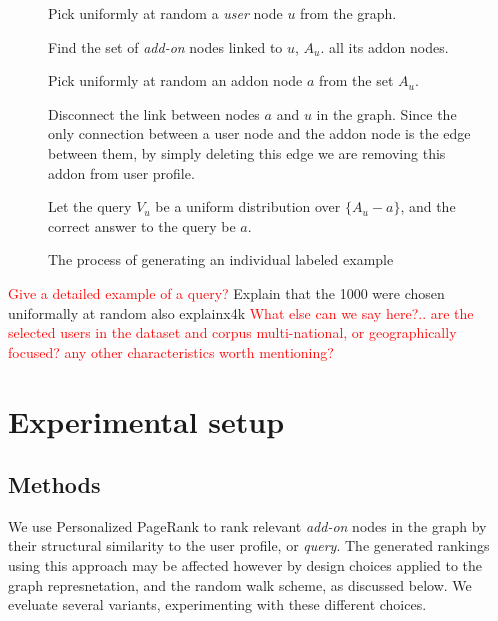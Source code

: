 \documentclass[11pt,oneside]{book}
\let\Oldsection\section
\renewcommand{\section}{\FloatBarrier\Oldsection}
\let\Oldsubsection\subsection
\renewcommand{\subsection}{\FloatBarrier\Oldsubsection}
\begin{document}
\begin{figure}
\begin{enumerate}[(a)]
\begin{small}
\item Pick uniformly at random a {\it user} node $u$ from the graph.
\item Find the set of {\it add-on} nodes linked to $u$, $A_u$.
  all its addon nodes.
\item Pick uniformly at random an addon node $a$ from the set $A_u$. 
\item Disconnect the link between nodes $a$ and $u$ in the
  graph. Since the only connection between a user node and the addon
  node is the edge between them, by simply deleting this edge we are
  removing this addon from user profile.
\item Let the query $V_u$ be a uniform distribution over $\{A_u-a\}$,
  and the correct answer to the query be $a$. 
\end{small}
\end{enumerate}
\caption{The process of generating an individual labeled example}
\label{fig:example-gen}
\end{figure}

\textcolor{red}{Give a detailed example of a query?}
Explain that the 1000 were chosen uniformally at random
also explainx4k
\textcolor{red}{What else can we say here?.. are the selected users in
  the dataset and corpus multi-national, or geographically focused?
  any other characteristics worth mentioning?}

\section{Experimental setup}

\subsection{Methods}
\label{sec:methods}

We use Personalized PageRank to rank relevant {\it add-on} nodes in
the graph by their structural similarity to the user profile, or {\it
  query}. The generated rankings using this approach may be affected
however by design choices applied to the graph represnetation, and the
random walk scheme, as discussed below. We eveluate several variants,
experimenting with these different choices.
\end{document}
